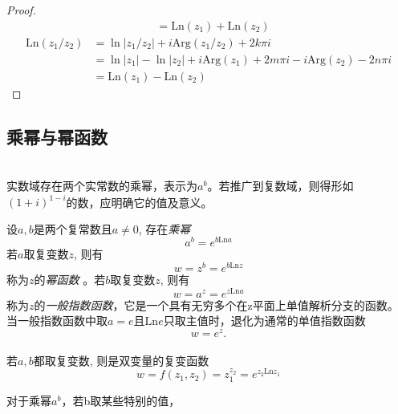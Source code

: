 \begin{compactenum}[(a)]
\begin{proof}
\[\begin{aligned}
      & =  \text{Ln}(z_1) +  \text{Ln}(z_2)
    \end{aligned}\]
    \[ \begin{aligned}
      \text{Ln}(z_1 /z_2) &= \ln |z_1 /z_2| + i \text{Arg} (z_1/ z_2) + 2 k \pi i \\
      & = \ln |z_1|  - \ln |z_2| +  i \text{Arg} (z_1)  +  2 m \pi i - i \text{Arg} (z_2) - 2 n \pi i \\ 
      & =  \text{Ln}(z_1) - \text{Ln}(z_2)
    \end{aligned}\]
  \end{proof}
\end{compactenum}

\subsection{乘幂与幂函数}
~\\
实数域存在两个实常数的乘幂，表示为$a^b$。若推广到复数域，则得形如$(1+i)^{1-i}$的数，应明确它的值及意义。
\begin{definition}
  设$a,b$是两个复常数且$a \ne 0$, 存在\emph{乘幂} 
  \begin{equation}
    a^b = e^{b\text{Ln}a}
  \end{equation}
  若$a$取复变数$z$, 则有 
  \begin{equation}
    w = z^b = e^{b\text{Ln}z}
  \end{equation}
  称为$z$的\emph{幂函数} 。若$b$取复变数$z$, 则有 
  \begin{equation}
    w = a^z = e^{z\text{Ln}a}
  \end{equation}
  称为$z$的\emph{一般指数函数}，它是一个具有无穷多个在z平面上单值解析分支的函数。\\
  当一般指数函数中取$a=e$且$\text{Ln} e$只取主值时，退化为通常的单值指数函数$$w = e^z.$$ \\
  若$a,b$都取复变数, 则是双变量的复变函数
  \begin{equation}
    w = f(z_1, z_2) = z_1^{z_2} = e^{z_2\text{Ln}z_1}
  \end{equation}
\end{definition}
对于乘幂$a^b$，若b取某些特别的值，
